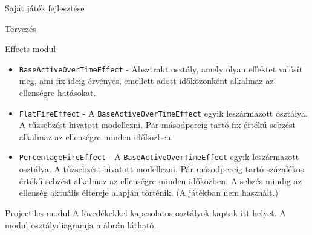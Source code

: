 \begin{MyChapter}{Saját játék fejlesztése}
\begin{MySection}{Tervezés}
\begin{MySubSection}{Effects modul}
\begin{itemize}
				\item \texttt{BaseActiveOverTimeEffect} - Absztrakt osztály, amely olyan effektet valósít meg, ami fix ideig érvényes, emellett adott időközönként alkalmaz az ellenségre hatásokat.

				\item \texttt{FlatFireEffect} - A \texttt{BaseActiveOverTimeEffect} egyik leszármazott osztálya. A tűzsebzést hivatott modellezni. Pár másodpercig tartó fix értékű sebzést alkalmaz az ellenségre minden időközben.
				
				\item \texttt{PercentageFireEffect} - A \texttt{BaseActiveOverTimeEffect} egyik leszármazott osztálya. A tűzsebzést hivatott modellezni. Pár másodpercig tartó százalékos értékű sebzést alkalmaz az ellenségre minden időközben. A sebzés mindig az ellenség aktuális éltereje alapján történik. (A játékban nem használt.)
			\end{itemize}
		\end{MySubSection}
	
		\begin{MySubSection}{Projectiles modul}
			A lövedékekkel kapcsolatos osztályok kaptak itt helyet.
			A modul osztálydiagramja a  ábrán látható.
		

\end{MySubSection}
\end{MySection}
\end{MyChapter}

